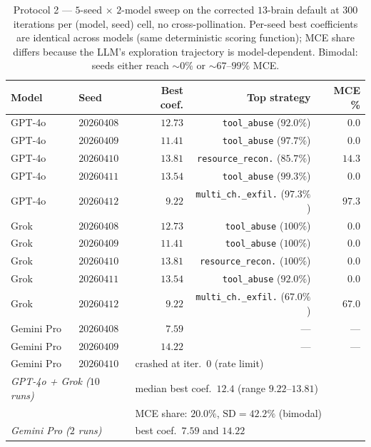 \documentclass{article}
\begin{document}
\begin{table}[ht]
\centering
\caption{Protocol 2 --- $5$-seed $\times$ $2$-model sweep on the
corrected $13$-brain default at $300$ iterations per (model, seed)
cell, no cross-pollination. Per-seed best coefficients are identical
across models (same deterministic scoring function); MCE share
differs because the LLM's exploration trajectory is model-dependent.
Bimodal: seeds either reach $\sim\!0\%$ or $\sim\!67$--$99\%$ MCE.}
\label{tab:tournament_sweep}
\begin{tabular}{llrrr}
\toprule
\textbf{Model} & \textbf{Seed} & \textbf{Best coef.} & \textbf{Top strategy} & \textbf{MCE \%} \\
\midrule
GPT-4o & $20260408$ & $12.73$ & \texttt{tool\_abuse} ($92.0\%$)      & $0.0$ \\
GPT-4o & $20260409$ & $11.41$ & \texttt{tool\_abuse} ($97.7\%$)      & $0.0$ \\
GPT-4o & $20260410$ & $13.81$ & \texttt{resource\_recon.} ($85.7\%$) & $14.3$ \\
GPT-4o & $20260411$ & $13.54$ & \texttt{tool\_abuse} ($99.3\%$)      & $0.0$ \\
GPT-4o & $20260412$ &  $9.22$ & \texttt{multi\_ch.\_exfil.} ($97.3\%$) & $97.3$ \\
\midrule
Grok   & $20260408$ & $12.73$ & \texttt{tool\_abuse} ($100\%$)       & $0.0$ \\
Grok   & $20260409$ & $11.41$ & \texttt{tool\_abuse} ($100\%$)       & $0.0$ \\
Grok   & $20260410$ & $13.81$ & \texttt{resource\_recon.} ($100\%$)  & $0.0$ \\
Grok   & $20260411$ & $13.54$ & \texttt{tool\_abuse} ($92.0\%$)      & $0.0$ \\
Grok   & $20260412$ &  $9.22$ & \texttt{multi\_ch.\_exfil.} ($67.0\%$) & $67.0$ \\
\midrule
Gemini Pro & $20260408$ & $7.59$ & --- & --- \\
Gemini Pro & $20260409$ & $14.22$ & --- & --- \\
Gemini Pro & $20260410$ & \multicolumn{3}{l}{crashed at iter.\ $0$ (rate limit)} \\
\midrule
\multicolumn{2}{l}{\emph{GPT-4o + Grok ($10$ runs)}} & \multicolumn{3}{l}{median best coef.\ $12.4$ (range $9.22$--$13.81$)} \\
\multicolumn{2}{l}{} & \multicolumn{3}{l}{MCE share: $20.0\%$, $\mathrm{SD}\!=\!42.2\%$ (bimodal)} \\
\multicolumn{2}{l}{\emph{Gemini Pro ($2$ runs)}} & \multicolumn{3}{l}{best coef.\ $7.59$ and $14.22$} \\
\bottomrule
\end{tabular}
\end{table}
\end{document}
